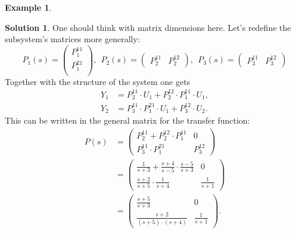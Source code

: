 \documentclass[a4paper,12 pt]{article}
\numberwithin{equation}{section}
\theoremstyle{definition}
\newtheorem{bsp}{Example}
\theoremstyle{remark}
\theoremstyle{definition}
\newtheorem*{lsg}{Solution}
\theoremstyle{definition}
\theoremstyle{definition}
\theoremstyle{remark}
\begin{document}
\begin{bsp}
\newpage
\begin{lsg}
One should think with matrix dimensions here. Let's redefine the subsystem's matrices more generally:
\begin{equation*}
P_1(s)=\begin{pmatrix}
P_1^{11}\\
P_1^{21}\\
\end{pmatrix}, \ \ P_2(s)=\begin{pmatrix}
P_2^{11}&P_2^{12}
\end{pmatrix}, \ \ P_3(s)=\begin{pmatrix} P_3^{11}&P_3^{12} \end{pmatrix}
\end{equation*}
Together with the structure of the system one gets
\begin{equation*}
\begin{split}
Y_1&=P_2^{11}\cdot U_1+P_2^{12}\cdot P_1^{11}\cdot U_1,\\
Y_2&=P_3^{11}\cdot P_1^{21}\cdot U_1+P_3^{12}\cdot U_2.
\end{split}
\end{equation*}
This can be written in the general matrix for the transfer function:
\begin{equation*}
\begin{split}
P(s)&=\begin{pmatrix}
P_2^{11}+P_2^{12}\cdot P_1^{11}&0 \\
P_3^{11}\cdot P_1^{21}&P_3^{12}
\end{pmatrix}\\
&=\begin{pmatrix}
\frac{1}{s+3}+\frac{s+4}{s-5}\cdot \frac{s-5}{s+3}&0 \\[6pt]
\frac{s+2}{s+5}\cdot \frac{1}{s+4}&\frac{1}{s+1}
\end{pmatrix}\\
&=\begin{pmatrix}
\frac{s+5}{s+3}&0\\[6pt]
\frac{s+2}{(s+5)\cdot (s+4)}&\frac{1}{s+1}
\end{pmatrix}.
\end{split}
\end{equation*}

\end{lsg}

\end{bsp}
\end{document}
